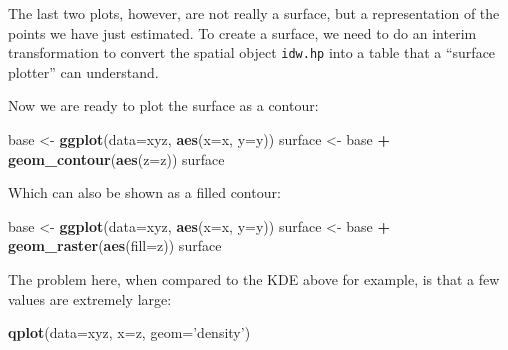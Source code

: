 \documentclass[
]{book}
\newenvironment{Shaded}{\begin{snugshade}}{\end{snugshade}}
\newcommand{\DataTypeTok}[1]{\textcolor[rgb]{0.13,0.29,0.53}{#1}}
\newcommand{\DecValTok}[1]{\textcolor[rgb]{0.00,0.00,0.81}{#1}}
\newcommand{\KeywordTok}[1]{\textcolor[rgb]{0.13,0.29,0.53}{\textbf{#1}}}
\newcommand{\NormalTok}[1]{#1}
\newcommand{\OperatorTok}[1]{\textcolor[rgb]{0.81,0.36,0.00}{\textbf{#1}}}
\newcommand{\StringTok}[1]{\textcolor[rgb]{0.31,0.60,0.02}{#1}}
\begin{document}
The last two plots, however, are not really a surface, but a representation of the points we have just estimated. To create a surface, we need to do an interim transformation to convert the spatial object \texttt{idw.hp} into a table that a ``surface plotter'' can understand.

\begin{Shaded}
\end{Shaded}

Now we are ready to plot the surface as a contour:

\begin{Shaded}
\begin{Highlighting}[]
\NormalTok{base <-}\StringTok{ }\KeywordTok{ggplot}\NormalTok{(}\DataTypeTok{data=}\NormalTok{xyz, }\KeywordTok{aes}\NormalTok{(}\DataTypeTok{x=}\NormalTok{x, }\DataTypeTok{y=}\NormalTok{y))}
\NormalTok{surface <-}\StringTok{ }\NormalTok{base }\OperatorTok{+}\StringTok{ }\KeywordTok{geom_contour}\NormalTok{(}\KeywordTok{aes}\NormalTok{(}\DataTypeTok{z=}\NormalTok{z))}
\NormalTok{surface}
\end{Highlighting}
\end{Shaded}

Which can also be shown as a filled contour:

\begin{Shaded}
\begin{Highlighting}[]
\NormalTok{base <-}\StringTok{ }\KeywordTok{ggplot}\NormalTok{(}\DataTypeTok{data=}\NormalTok{xyz, }\KeywordTok{aes}\NormalTok{(}\DataTypeTok{x=}\NormalTok{x, }\DataTypeTok{y=}\NormalTok{y))}
\NormalTok{surface <-}\StringTok{ }\NormalTok{base }\OperatorTok{+}\StringTok{ }\KeywordTok{geom_raster}\NormalTok{(}\KeywordTok{aes}\NormalTok{(}\DataTypeTok{fill=}\NormalTok{z))}
\NormalTok{surface}
\end{Highlighting}
\end{Shaded}

The problem here, when compared to the KDE above for example, is that a few values are extremely large:

\begin{Shaded}
\begin{Highlighting}[]
\KeywordTok{qplot}\NormalTok{(}\DataTypeTok{data=}\NormalTok{xyz, }\DataTypeTok{x=}\NormalTok{z, }\DataTypeTok{geom=}\StringTok{'density'}\NormalTok{)}
\end{Highlighting}
\end{Shaded}
\end{document}
